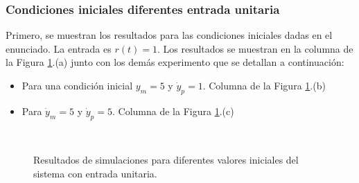 \documentclass[letterpaper,11pt]{article} %
\begin{document}
\subsubsection{Condiciones iniciales diferentes entrada unitaria}
Primero, se muestran los resultados para las condiciones iniciales dadas en el enunciado. La entrada es $r(t) = 1$. Los resultados se muestran en la columna de la Figura \ref{inicialrl}.(a) junto con los demás experimento que se detallan a continuación:
\begin{itemize}
	\item Para una condición inicial $y_m = 5$ y $\dot{y}_p = 1$. Columna de la Figura \ref{inicialrl}.(b)
	\item Para $\dot{y}_m = 5$ y $\dot{y}_p = 5$. Columna de la Figura \ref{inicialrl}.(c)
\end{itemize}
\newpage
\begin{figure}[h]
	\centering
	\captionsetup{justification=centering}
	\newline
	\noindent
	\newline
	\noindent\\
	\addtocounter{figure}{-1}  
	\caption{Resultados de simulaciones para diferentes valores iniciales del sistema con entrada unitaria.}
	\label{inicialrl}
\end{figure}
\end{document}
